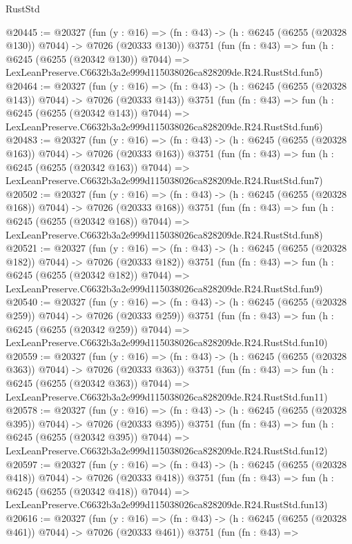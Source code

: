 \begin{lexlean}{RustStd}
\begin{coremodule}
@20445 := @20327
    (fun (y : @16) => (fn : @43) -> (h : @6245 (@6255 (@20328 @130)) @7044) -> @7026 (@20333 @130))
    @3751
    (fun (fn : @43) =>
    fun (h : @6245 (@6255 (@20342 @130)) @7044) =>
    LexLeanPreserve.C6632b3a2e999d115038026ca828209de.R24.RustStd.fun5)
@20464 := @20327
    (fun (y : @16) => (fn : @43) -> (h : @6245 (@6255 (@20328 @143)) @7044) -> @7026 (@20333 @143))
    @3751
    (fun (fn : @43) =>
    fun (h : @6245 (@6255 (@20342 @143)) @7044) =>
    LexLeanPreserve.C6632b3a2e999d115038026ca828209de.R24.RustStd.fun6)
@20483 := @20327
    (fun (y : @16) => (fn : @43) -> (h : @6245 (@6255 (@20328 @163)) @7044) -> @7026 (@20333 @163))
    @3751
    (fun (fn : @43) =>
    fun (h : @6245 (@6255 (@20342 @163)) @7044) =>
    LexLeanPreserve.C6632b3a2e999d115038026ca828209de.R24.RustStd.fun7)
@20502 := @20327
    (fun (y : @16) => (fn : @43) -> (h : @6245 (@6255 (@20328 @168)) @7044) -> @7026 (@20333 @168))
    @3751
    (fun (fn : @43) =>
    fun (h : @6245 (@6255 (@20342 @168)) @7044) =>
    LexLeanPreserve.C6632b3a2e999d115038026ca828209de.R24.RustStd.fun8)
@20521 := @20327
    (fun (y : @16) => (fn : @43) -> (h : @6245 (@6255 (@20328 @182)) @7044) -> @7026 (@20333 @182))
    @3751
    (fun (fn : @43) =>
    fun (h : @6245 (@6255 (@20342 @182)) @7044) =>
    LexLeanPreserve.C6632b3a2e999d115038026ca828209de.R24.RustStd.fun9)
@20540 := @20327
    (fun (y : @16) => (fn : @43) -> (h : @6245 (@6255 (@20328 @259)) @7044) -> @7026 (@20333 @259))
    @3751
    (fun (fn : @43) =>
    fun (h : @6245 (@6255 (@20342 @259)) @7044) =>
    LexLeanPreserve.C6632b3a2e999d115038026ca828209de.R24.RustStd.fun10)
@20559 := @20327
    (fun (y : @16) => (fn : @43) -> (h : @6245 (@6255 (@20328 @363)) @7044) -> @7026 (@20333 @363))
    @3751
    (fun (fn : @43) =>
    fun (h : @6245 (@6255 (@20342 @363)) @7044) =>
    LexLeanPreserve.C6632b3a2e999d115038026ca828209de.R24.RustStd.fun11)
@20578 := @20327
    (fun (y : @16) => (fn : @43) -> (h : @6245 (@6255 (@20328 @395)) @7044) -> @7026 (@20333 @395))
    @3751
    (fun (fn : @43) =>
    fun (h : @6245 (@6255 (@20342 @395)) @7044) =>
    LexLeanPreserve.C6632b3a2e999d115038026ca828209de.R24.RustStd.fun12)
@20597 := @20327
    (fun (y : @16) => (fn : @43) -> (h : @6245 (@6255 (@20328 @418)) @7044) -> @7026 (@20333 @418))
    @3751
    (fun (fn : @43) =>
    fun (h : @6245 (@6255 (@20342 @418)) @7044) =>
    LexLeanPreserve.C6632b3a2e999d115038026ca828209de.R24.RustStd.fun13)
@20616 := @20327
    (fun (y : @16) => (fn : @43) -> (h : @6245 (@6255 (@20328 @461)) @7044) -> @7026 (@20333 @461))
    @3751
    (fun (fn : @43) =>

\end{coremodule}
\end{lexlean}
